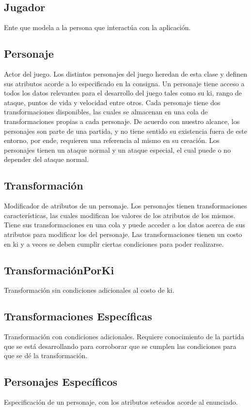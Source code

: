 \documentclass[a4paper]{article}
\begin{document}
\subsection{Jugador}
Ente que modela a la persona que interactúa con la aplicación.

\subsection{Personaje}
Actor del juego. Los distintos personajes del juego heredan de esta clase y definen sus atributos acorde a lo especificado en la consigna. Un personaje tiene acceso a todos los datos relevantes para el desarrollo del juego tales como su ki, rango de ataque, puntos de vida y velocidad entre otros. Cada personaje tiene dos transformaciones disponibles, las cuales se almacenan en una cola de transformaciones propias a cada personaje. De acuerdo con nuestro alcance, los personajes son parte de una partida, y no tiene sentido su existencia fuera de este entorno, por ende, requieren una referencia al mismo en su creación. Los personajes tienen un ataque normal y un ataque especial, el cual puede o no depender del ataque normal. 


\subsection{Transformación}
 Modificador de atributos de un personaje. Los personajes tienen transformaciones características, las cuales modifican los valores de los atributos de los mismos. Tiene sus transformaciones en una cola y puede acceder a los datos acerca de sus atributos para modificar los del personaje. Las transformaciones tienen un costo en ki y a veces se deben cumplir ciertas condiciones para poder realizarse.

\subsection{TransformaciónPorKi}
Transformación sin condiciones adicionales al costo de ki.

\subsection{Transformaciones Específicas}
Transformación con condiciones adicionales. Requiere conocimiento de la partida que se está desarrollando para corroborar que se cumplen las condiciones para que se dé la transformación.

\subsection{Personajes Específicos}
Especificación de un personaje, con los atributos seteados acorde al enunciado.
\end{document}
